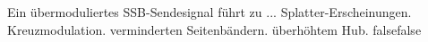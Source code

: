     {Ein übermoduliertes SSB-Sendesignal führt zu ...}
    {Splatter-Erscheinungen.}
    {Kreuzmodulation.}
    {verminderten Seitenbändern.}
    {überhöhtem Hub.}
    {false}{false}